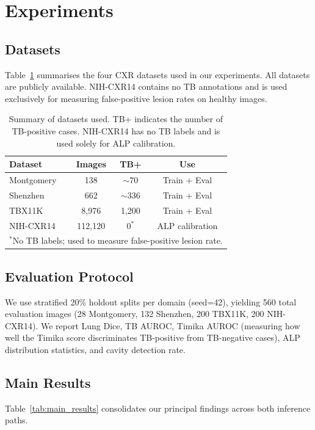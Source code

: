 \documentclass{article}
\begin{document}
\section{Experiments}

\subsection{Datasets}

Table~\ref{tab:datasets} summarises the four CXR datasets used in our experiments. All datasets are publicly available. NIH-CXR14 contains no TB annotations and is used exclusively for measuring false-positive lesion rates on healthy images.

\begin{table}[t]
\caption{Summary of datasets used. TB+ indicates the number of TB-positive cases. NIH-CXR14 has no TB labels and is used solely for ALP calibration.}
\label{tab:datasets}
\vskip 0.1in
\centering
\begin{tabular}{lccc}
\toprule
Dataset & Images & TB+ & Use \\
\midrule
Montgomery & 138 & $\sim$70 & Train + Eval \\
Shenzhen & 662 & $\sim$336 & Train + Eval \\
TBX11K & 8,976 & 1,200 & Train + Eval \\
NIH-CXR14 & 112,120 & 0$^*$ & ALP calibration \\
\bottomrule
\multicolumn{4}{l}{\footnotesize $^*$No TB labels; used to measure false-positive lesion rate.}
\end{tabular}
\end{table}

\subsection{Evaluation Protocol}

We use stratified 20\% holdout splits per domain (seed=42), yielding 560 total evaluation images (28 Montgomery, 132 Shenzhen, 200 TBX11K, 200 NIH-CXR14). We report Lung Dice, TB AUROC, Timika AUROC (measuring how well the Timika score discriminates TB-positive from TB-negative cases), ALP distribution statistics, and cavity detection rate.

\subsection{Main Results}

Table~\ref{tab:main_results} consolidates our principal findings across both inference paths.
\end{document}
